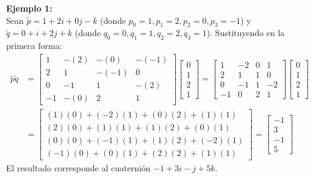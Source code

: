 \textbf{Ejemplo 1:} \\
Sean $\tilde{p} = 1 + 2i + 0j - k$ (donde $p_0=1, p_1=2, p_2=0, p_3=-1$) y $\tilde{q} = 0 + i + 2j + k$ (donde $q_0=0, q_1=1, q_2=2, q_3=1$). Sustituyendo en la primera forma:
\begin{align*}
    \tilde{p}\tilde{q} &= 
    \begin{bmatrix}
        1 & -(2) & -(0) & -(-1) \\
        2 &  1 & -(-1) &  0 \\
        0 & -1 &  1 & -(2) \\
        -1 & -(0) &  2 &  1
    \end{bmatrix}
    \begin{bmatrix}
        0 \\ 1 \\ 2 \\ 1
    \end{bmatrix}
    =
    \begin{bmatrix}
        1 & -2 & 0 & 1 \\
        2 & 1 & 1 & 0 \\
        0 & -1 & 1 & -2 \\
        -1 & 0 & 2 & 1
    \end{bmatrix}
    \begin{bmatrix}
        0 \\ 1 \\ 2 \\ 1
    \end{bmatrix} \\
    &=
    \begin{bmatrix}
        (1)(0) + (-2)(1) + (0)(2) + (1)(1) \\
        (2)(0) + (1)(1) + (1)(2) + (0)(1) \\
        (0)(0) + (-1)(1) + (1)(2) + (-2)(1) \\
        (-1)(0) + (0)(1) + (2)(2) + (1)(1)
    \end{bmatrix}
    =
    \begin{bmatrix}
        -1 \\ 3 \\ -1 \\ 5
    \end{bmatrix}
\end{align*}
El resultado corresponde al cuaternión $-1 + 3i - j + 5k$.

